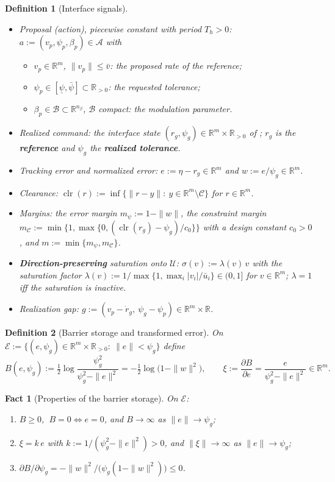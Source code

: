 \documentclass[11pt]{article}\usepackage[margin=1in]{geometry}\usepackage{amsmath,amssymb,amsthm,mathtools}\usepackage{graphicx}\graphicspath{{figures/}{../figures/}{figs/}{./}}\usepackage{enumitem}\usepackage{hyperref}\usepackage{cleveref}\usepackage{tikz}\usetikzlibrary{arrows.meta,positioning,calc,shapes.geometric}\usepackage{float}\usepackage{rotating}\usepackage[most]{tcolorbox}\usepackage{kotex}\usepackage{booktabs}\emergencystretch=1.6em\tolerance=2000 \crefname{assumption}{Assumption}{Assumptions}\Crefname{assumption}{Assumption}{Assumptions}\crefname{definition}{Definition}{Definitions}\Crefname{definition}{Definition}{Definitions}\crefname{proposition}{Proposition}{Propositions}\Crefname{proposition}{Proposition}{Propositions}\crefname{fact}{Fact}{Facts}\Crefname{fact}{Fact}{Facts} \newtheorem{assumption}{Assumption}\newtheorem{definition}{Definition}\newtheorem{lemma}{Lemma}\newtheorem{proposition}{Proposition}\newtheorem{theorem}{Theorem}\newtheorem{corollary}{Corollary}\newtheorem{fact}{Fact}\theoremstyle{remark}\newtheorem{remark}{Remark} \newcommand{\R}{\mathbb{R}}\newcommand{\xb}{\bar x}\newcommand{\Ab}{\bar A}\newcommand{\By}{\bar B_y}\newcommand{\U}{\mathcal U}\newcommand{\Z}{\mathcal Z}
\newcommand{\Cset}{\mathcal C}\newcommand{\Pcl}{\mathcal P}\newcommand{\Kset}{\mathcal K}
\begin{document}
\begin{definition}[Interface signals]
\label{def:signals}
\begin{itemize}
\item Proposal (action), piecewise constant with period $T_h>0$: $a:=(v_p,\psi_p,\beta_p)\in\mathcal A$ with
\begin{itemize}
\item $v_p\in\R^m$, $\|v_p\|\le\bar v$: the proposed rate of the reference;
\item $\psi_p\in[\underline\psi,\bar\psi]\subset\R_{>0}$: the requested tolerance;
\item $\beta_p\in\mathcal B\subset\R^{n_\beta}$, $\mathcal B$ compact: the modulation parameter.
\end{itemize}
\item Realized command: the interface state $(r_g,\psi_g)\in\R^m\times\R_{>0}$ of ; $r_g$ is the \textbf{\emph{reference}} and $\psi_g$ the \textbf{\emph{realized tolerance}}.
\item Tracking error and normalized error: $e:=\eta-r_g\in\R^m$ and $w:=e/\psi_g\in\R^m$.
\item Clearance: $\operatorname{clr}(r):=\inf\{\|r-y\|:\ y\in\R^m\setminus\Cset\}$ for $r\in\R^m$.
\item Margins: the error margin $m_\psi:=1-\|w\|$, the constraint margin $m_{\Cset}:=\min\{1,\max\{0,(\operatorname{clr}(r_g)-\psi_g)/c_0\}\}$ with a design constant $c_0>0$, and $m:=\min\{m_\psi,m_{\Cset}\}$.
\item \textbf{\emph{Direction-preserving}} saturation onto $\U$: $\sigma(v):=\lambda(v)\,v$ with the saturation factor $\lambda(v):=1/\max\{1,\max_i|v_i|/\bar u_i\}\in(0,1]$ for $v\in\R^m$; $\lambda=1$ iff the saturation is inactive.
\item Realization gap: $g:=(v_p-\dot r_g,\ \psi_g-\psi_p)\in\R^m\times\R$.
\end{itemize}
\end{definition}

\begin{definition}[Barrier storage and transformed error]
\label{def:barrier}
On $\mathcal E:=\{(e,\psi_g)\in\R^m\times\R_{>0}:\ \|e\|<\psi_g\}$ define
\[
B(e,\psi_g):=\tfrac12\log\frac{\psi_g^2}{\psi_g^2-\|e\|^2}=-\tfrac12\log\big(1-\|w\|^2\big),\qquad \xi:=\frac{\partial B}{\partial e}=\frac{e}{\psi_g^2-\|e\|^2}\in\R^m .
\]
\end{definition}

\begin{fact}[Properties of the barrier storage]
\label{fact:barrier}
On $\mathcal E$:
\begin{enumerate}[label=(\alph*)]
\item $B\ge0$, $\ B=0\iff e=0$, and $B\to\infty$ as $\|e\|\to\psi_g$;
\item $\xi=k\,e$ with $k:=1/(\psi_g^2-\|e\|^2)>0$, and $\|\xi\|\to\infty$ as $\|e\|\to\psi_g$;
\item $\partial B/\partial\psi_g=-\|w\|^2/\big(\psi_g(1-\|w\|^2)\big)\le0$.
\end{enumerate}
\end{fact}
\end{document}
